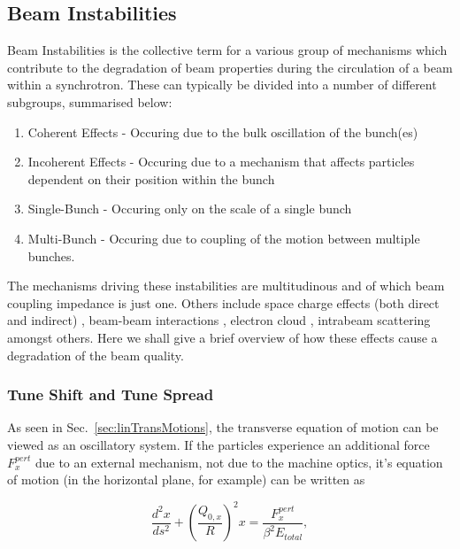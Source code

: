 \subsection{Beam Instabilities}

Beam Instabilities is the collective term for a various group of mechanisms which contribute to the degradation of beam properties during the circulation of a beam within a synchrotron. These can typically be divided into a number of different subgroups, summarised below:

\begin{enumerate}
\item{Coherent Effects - Occuring due to the bulk oscillation of the bunch(es)}
\item{Incoherent Effects - Occuring due to a mechanism that affects particles dependent on their position within the bunch}
\item{Single-Bunch - Occuring only on the scale of a single bunch}
\item{Multi-Bunch - Occuring due to coupling of the motion between multiple bunches}.
\end{enumerate}

The mechanisms driving these instabilities are multitudinous and of which beam coupling impedance is just one. Others include space charge effects (both direct and indirect) \cite{Burov:TransInstabSC, Boine-Frankenheim:InstabSCRings}, beam-beam interactions \cite{Pieloni:PhDThesis}, electron cloud \cite{Li:ECloud}, intrabeam scattering \cite{Schaumann:IBS, Mertens:IBSThesis} amongst others. Here we shall give a brief overview of how these effects cause a degradation of the beam quality.

\subsubsection{Tune Shift and Tune Spread} 

As seen in Sec.~\ref{sec:linTransMotions}, the transverse equation of motion can be viewed as an oscillatory system. If the particles experience an additional force $ F^{pert}_{x}$ due to an external mechanism, not due to the machine optics, it's equation of motion (in the horizontal plane, for example) can be written as

\begin{equation}
\frac{d^{2}x}{ds^{2}} + \left(\frac{Q_{0,x}}{R}\right)^{2} x = \frac{F^{pert}_{x}}{\beta^{2} E_{total}},
\end{equation}

